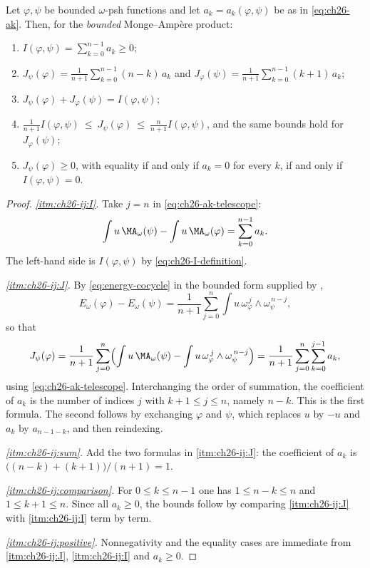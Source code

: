 \begin{theorem}
\label{thm:ch26-mixed-energy-identities}
Let $\varphi,\psi$ be bounded $\omega$-psh functions and let
$a_k=a_k(\varphi,\psi)$ be as in \eqref{eq:ch26-ak}.  Then, for the
\emph{bounded} Monge--Amp\`ere product:
\begin{enumerate}
\item\label{itm:ch26-ij:I}
 $\displaystyle I(\varphi,\psi)=\sum_{k=0}^{n-1}a_k\geq0$;
\item\label{itm:ch26-ij:J}
 $\displaystyle J_\psi(\varphi)=\frac1{n+1}\sum_{k=0}^{n-1}(n-k)\,a_k$
 and
 $\displaystyle J_\varphi(\psi)=\frac1{n+1}\sum_{k=0}^{n-1}(k+1)\,a_k$;
\item\label{itm:ch26-ij:sum}
 $J_\psi(\varphi)+J_\varphi(\psi)=I(\varphi,\psi)$;
\item\label{itm:ch26-ij:comparison}
 $\displaystyle
 \frac1{n+1}I(\varphi,\psi)\ \leq\ J_\psi(\varphi)\ \leq\
 \frac{n}{n+1}I(\varphi,\psi)$,
 and the same bounds hold for $J_\varphi(\psi)$;
\item\label{itm:ch26-ij:positive}
 $J_\psi(\varphi)\geq0$, with equality if and only if $a_k=0$ for every
 $k$, if and only if $I(\varphi,\psi)=0$.
\end{enumerate}
\end{theorem}

\begin{proof}
\emph{\cref{itm:ch26-ij:I}.}  Take $j=n$ in
\eqref{eq:ch26-ak-telescope}:
\[
 \int u\,\MA_\omega(\psi)-\int u\,\MA_\omega(\varphi)
 =\sum_{k=0}^{n-1}a_k .
\]
The left-hand side is $I(\varphi,\psi)$ by
\eqref{eq:ch26-I-definition}.

\emph{\cref{itm:ch26-ij:J}.}  By \eqref{eq:energy-cocycle} in the bounded form
supplied by \Cref{prop:bounded-energy-identities},
\[
 E_\omega(\varphi)-E_\omega(\psi)
 =\frac1{n+1}\sum_{j=0}^n\int u\,
   \omega_\varphi^{\,j}\wedge\omega_\psi^{\,n-j},
\]
so that
\[
 J_\psi(\varphi)
 =\frac1{n+1}\sum_{j=0}^n
   \Bigl(\int u\,\MA_\omega(\psi)
        -\int u\,\omega_\varphi^{\,j}\wedge\omega_\psi^{\,n-j}\Bigr)
 =\frac1{n+1}\sum_{j=0}^n\sum_{k=0}^{j-1}a_k ,
\]
using \eqref{eq:ch26-ak-telescope}.  Interchanging the order of summation,
the coefficient of $a_k$ is the number of indices $j$ with
$k+1\leq j\leq n$, namely $n-k$.  This is the first formula.  The second
follows by exchanging $\varphi$ and $\psi$, which replaces $u$ by
$-u$ and $a_k$ by $a_{n-1-k}$, and then reindexing.

\emph{\cref{itm:ch26-ij:sum}.}  Add the two formulas in
\cref{itm:ch26-ij:J}: the coefficient of $a_k$ is
$\bigl((n-k)+(k+1)\bigr)/(n+1)=1$.

\emph{\cref{itm:ch26-ij:comparison}.}  For $0\leq k\leq n-1$ one has
$1\leq n-k\leq n$ and $1\leq k+1\leq n$.  Since all $a_k\geq0$, the
bounds follow by comparing \cref{itm:ch26-ij:J} with
\cref{itm:ch26-ij:I} term by term.

\emph{\cref{itm:ch26-ij:positive}.}  Nonnegativity and the equality cases are
immediate from \cref{itm:ch26-ij:J}, \cref{itm:ch26-ij:I} and $a_k\geq0$.
\end{proof}

